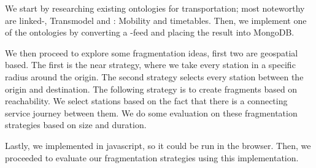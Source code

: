 We start by researching existing ontologies for transportation; most noteworthy are linked-, Transmodel and : Mobility and timetables. Then, we implement one of the ontologies by converting a -feed and placing the result into MongoDB. 

We then proceed to explore some fragmentation ideas, first two are geospatial based. The first is the near strategy, where we take every station in a specific radius around the origin. The second strategy selects every station between the origin and destination. The following strategy is to create fragments based on reachability. We select stations based on the fact that there is a connecting service journey between them. We do some evaluation on these fragmentation strategies based on size and duration.

Lastly, we implemented  in javascript, so it could be run in the browser. Then, we proceeded to evaluate our fragmentation strategies using this implementation.

